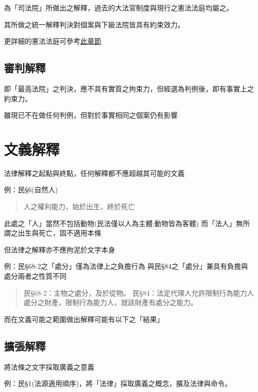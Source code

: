 \documentclass[
]{book}
\begin{document}
為「司法院」所做出之解釋，過去的大法官制度與現行之憲法法庭均屬之。

其所做之統一解釋判決對個案與下級法院皆具有約束效力。

更詳細的憲法法庭可參考\href{https://criminal.lsyverycute.com/司法與立法解釋.html\#司法函釋司法院院字院解字-參考來源}{此章節}

\hypertarget{ux5be9ux5224ux89e3ux91cb}{%
\subsection{審判解釋}\label{ux5be9ux5224ux89e3ux91cb}}

即「最高法院」之判決，應不具有實質之拘束力，但經選為判例後，即有事實上之約束力。

雖現已不在做任何判例，但對於事實相同之個案仍有影響

\hypertarget{ux6587ux7fa9ux89e3ux91cb}{%
\section{文義解釋}\label{ux6587ux7fa9ux89e3ux91cb}}

法律解釋之起點與終點，任何解釋都不應超越其可能的文義

例：民§6(自然人)

\begin{quote}
人之權利能力，始於出生，終於死亡
\end{quote}

此處之「人」當然不包括動物(民法僅以人為主體;動物皆為客體)
而「法人」無所謂之出生與死亡，固不適用本條

但法律之解釋亦不應拘泥於文字本身

例：民§68-2之「處分」僅為法律上之負擔行為
與民§84之「處分」兼具有負擔與處分兩者之性質不同

\begin{quote}
民§68-2：主物之處分，及於從物。
民§84：法定代理人允許限制行為能力人處分之財產，限制行為能力人，就該財產有處分之能力。
\end{quote}

而在文義可能之範圍做出解釋可能有以下之「結果」

\hypertarget{ux64f4ux5f35ux89e3ux91cb}{%
\subsection{擴張解釋}\label{ux64f4ux5f35ux89e3ux91cb}}

將法條之文字採取廣義之意義

例：民§1(法源適用順序)，將「法律」採取廣義之概念，擴及法律與命令。
\end{document}

